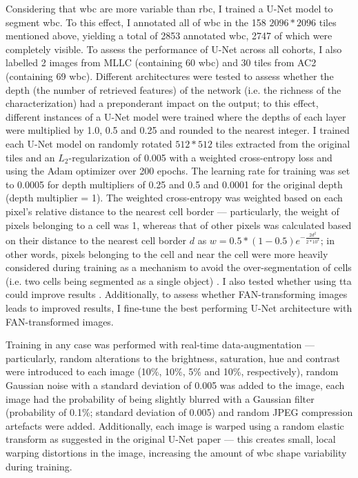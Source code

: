 Considering that \ac{wbc} are more variable than \ac{rbc}, I trained a U-Net model \cite{Ronneberger2015-do} to segment \ac{wbc}. To this effect, I annotated all of \ac{wbc} in the 158 $2096*2096$ tiles mentioned above, yielding a total of 2853 annotated \ac{wbc}, 2747 of which were completely visible. To assess the performance of U-Net across all cohorts, I also labelled 2 images from MLLC (containing 60 \ac{wbc}) and 30 tiles from AC2 (containing 69 \ac{wbc}). Different architectures were tested to assess whether the depth (the number of retrieved features) of the network (i.e. the richness of the characterization) had a preponderant impact on the output; to this effect, different instances of a U-Net model were trained where the depths of each layer were multiplied by 1.0, 0.5 and 0.25 and rounded to the nearest integer. I trained each U-Net model on randomly rotated $512*512$ tiles extracted from the original tiles and an $L_2$-regularization of 0.005 with a weighted cross-entropy loss and using the Adam optimizer \cite{Kingma2014-zd} over 200 epochs. The learning rate for training was set to 0.0005 for depth multipliers of 0.25 and 0.5 and 0.0001 for the original depth (depth multiplier = 1). The weighted cross-entropy was weighted based on each pixel's relative distance to the nearest cell border --- particularly, the weight of pixels belonging to a cell was 1, whereas that of other pixels was calculated based on their distance to the nearest cell border $d$ as $w = 0.5 * (1-0.5)e^{-\frac{2d^2}{2*10^2}}$; in other words, pixels belonging to the cell and near the cell were more heavily considered during training as a mechanism to avoid the over-segmentation of cells (i.e. two cells being segmented as a single object) \cite{Ronneberger2015-do}. I also tested whether using \ac{tta} could improve results \cite{Moshkov2020-rc}. Additionally, to assess whether FAN-transforming images leads to improved results, I fine-tune the best performing U-Net architecture with FAN-transformed images.

Training in any case was performed with real-time data-augmentation --- particularly, random alterations to the brightness, saturation, hue and contrast were introduced to each image (10\%, 10\%, 5\% and 10\%, respectively), random Gaussian noise with a standard deviation of 0.005 was added to the image, each image had the probability of being slightly blurred with a Gaussian filter (probability of 0.1\%; standard deviation of 0.005) and random JPEG compression artefacts were added. Additionally, each image is warped using a random elastic transform as suggested in the original U-Net paper \cite{Ronneberger2015-do} --- this creates small, local warping distortions in the image, increasing the amount of \ac{wbc} shape variability during training. 

